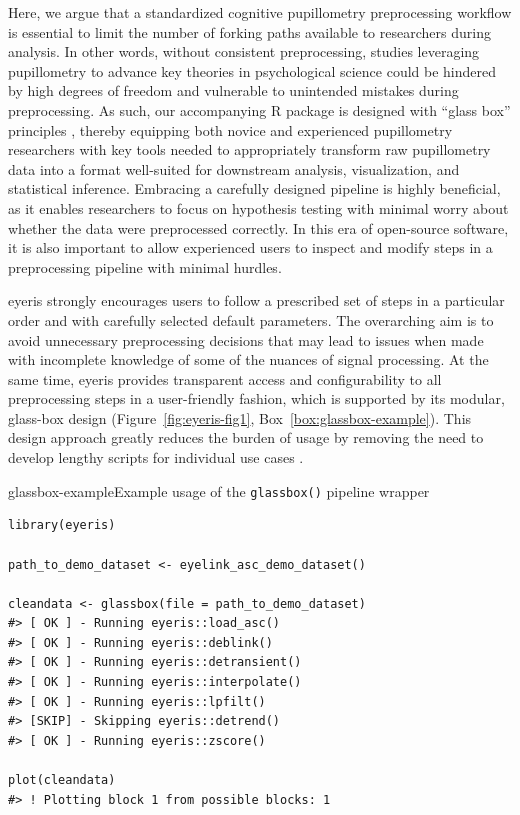 Here, we argue that a standardized cognitive pupillometry preprocessing workflow is essential to limit the number of forking paths available to researchers during analysis. In other words, without consistent preprocessing, studies leveraging pupillometry to advance key theories in psychological science could be hindered by high degrees of freedom and vulnerable to unintended mistakes during preprocessing. As such, our accompanying R package is designed with ``glass box'' principles \parencite[see][]{esteban2019fmriprep,poldrack2019computational}, thereby equipping both novice and experienced pupillometry researchers with key tools needed to appropriately transform raw pupillometry data into a format well-suited for downstream analysis, visualization, and statistical inference. Embracing a carefully designed pipeline is highly beneficial, as it enables researchers to focus on hypothesis testing with minimal worry about whether the data were preprocessed correctly. In this era of open-source software, it is also important to allow experienced users to inspect and modify steps in a preprocessing pipeline with minimal hurdles.

eyeris strongly encourages users to follow a prescribed set of steps in a particular order and with carefully selected default parameters. The overarching aim is to avoid unnecessary preprocessing decisions that may lead to issues when made with incomplete knowledge of some of the nuances of signal processing. At the same time, eyeris provides transparent access and configurability to all preprocessing steps in a user-friendly fashion, which is supported by its modular, glass-box design (Figure~\ref{fig:eyeris-fig1}, Box~\ref{box:glassbox-example}). This design approach greatly reduces the burden of usage by removing the need to develop lengthy scripts for individual use cases \parencite{varoquaux2016beyond}.

\begin{eyerisbox}{glassbox-example}{Example usage of the \texttt{glassbox()} pipeline wrapper}
\begin{lstlisting}
library(eyeris)

path_to_demo_dataset <- eyelink_asc_demo_dataset()

cleandata <- glassbox(file = path_to_demo_dataset)
#> [ OK ] - Running eyeris::load_asc()
#> [ OK ] - Running eyeris::deblink()
#> [ OK ] - Running eyeris::detransient()
#> [ OK ] - Running eyeris::interpolate()
#> [ OK ] - Running eyeris::lpfilt()
#> [SKIP] - Skipping eyeris::detrend()
#> [ OK ] - Running eyeris::zscore()

plot(cleandata)
#> ! Plotting block 1 from possible blocks: 1
\end{lstlisting}
\end{eyerisbox}

